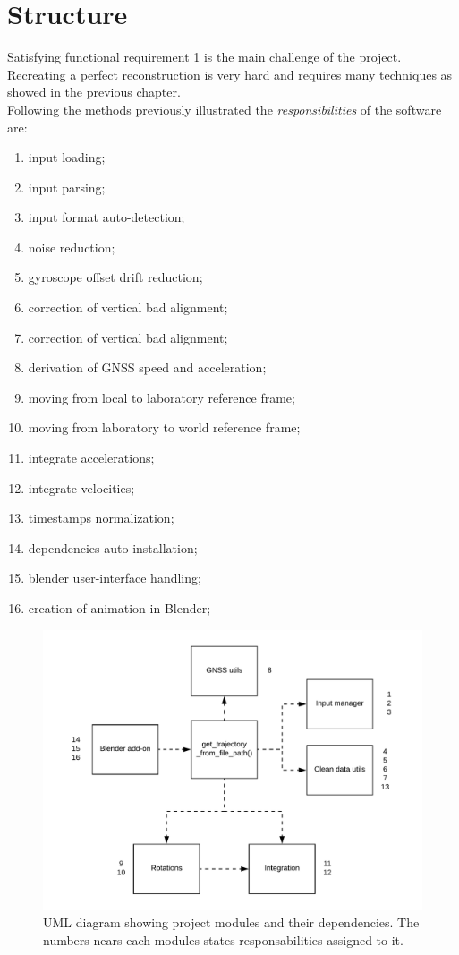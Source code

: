 \section{Structure}
Satisfying functional requirement 1 is the main challenge of the project. Recreating a perfect reconstruction is very hard and requires many techniques as showed in the previous chapter. \\
Following the methods previously illustrated the \textit{responsibilities} of the software are:
\begin{enumerate}
\item input loading;
\item input parsing;
\item input format auto-detection;
\item noise reduction;
\item gyroscope offset drift reduction;
\item correction of vertical bad alignment;
\item correction of vertical bad alignment;
\item derivation of GNSS speed and acceleration;
\item moving from local to laboratory reference frame;
\item moving from laboratory to world reference frame;
\item integrate accelerations;
\item integrate velocities;
\item timestamps normalization;
\item dependencies auto-installation;
\item blender user-interface handling;
\item creation of animation in Blender;
\end{enumerate}

\begin{figure}[H]
\includegraphics[width=\textwidth]{structure.png}
\caption{UML diagram showing project modules and their dependencies. The numbers nears each modules states responsabilities assigned to it.}
\end{figure}

